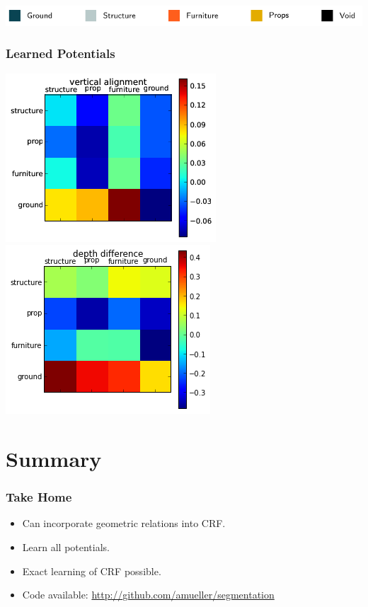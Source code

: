 \documentclass[final,ignorenonframetext,compress]{beamer}
\begin{document}
\begin{frame}
\begin{tabularx}{\linewidth}{@{\extracolsep{\fill}}cccccc}

    \end{tabularx}
        \includegraphics[width=\linewidth]{legend.pdf}
    \end{frame}


    \begin{frame}
    \begin{center}
        \frametitle{Learned Potentials}
        \includegraphics[width=.45\linewidth]{images/vertical_alignment_png}
        \includegraphics[width=.45\linewidth]{images/depth_difference_png}
    \end{center}
    \end{frame}


    \section*{Summary}
    \begin{frame}
        \frametitle{Take Home}
        \begin{itemize}
            \item Can incorporate geometric relations into CRF.
            \item Learn all potentials.
            \item Exact learning of CRF possible.
            \item Code available: \url{http://github.com/amueller/segmentation}
        \end{itemize}
    \end{frame}
    
\end{document}
